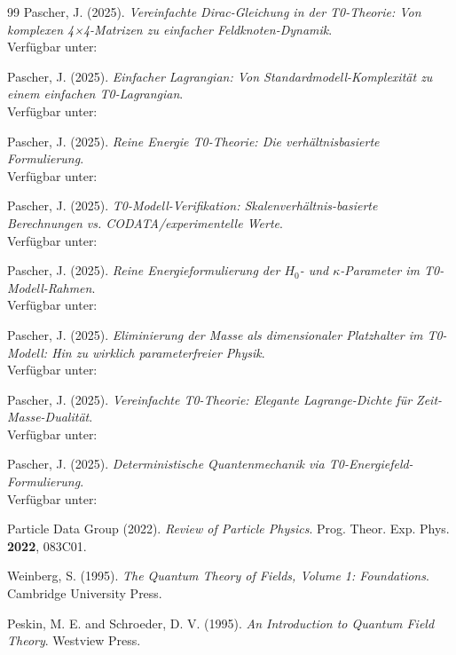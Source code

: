 	\begin{thebibliography}{99}
		Pascher, J. (2025). \textit{Vereinfachte Dirac-Gleichung in der T0-Theorie: Von komplexen 4×4-Matrizen zu einfacher Feldknoten-Dynamik}. \\
		Verfügbar unter: 
		
		Pascher, J. (2025). \textit{Einfacher Lagrangian: Von Standardmodell-Komplexität zu einem einfachen T0-Lagrangian}. \\
		Verfügbar unter: 
		
		Pascher, J. (2025). \textit{Reine Energie T0-Theorie: Die verhältnisbasierte Formulierung}. \\
		Verfügbar unter: 
		
		Pascher, J. (2025). \textit{T0-Modell-Verifikation: Skalenverhältnis-basierte Berechnungen vs. CODATA/experimentelle Werte}. \\
		Verfügbar unter: 
		
		Pascher, J. (2025). \textit{Reine Energieformulierung der $H_0$- und $\kappa$-Parameter im T0-Modell-Rahmen}. \\
		Verfügbar unter: 
		
		Pascher, J. (2025). \textit{Eliminierung der Masse als dimensionaler Platzhalter im T0-Modell: Hin zu wirklich parameterfreier Physik}. \\
		Verfügbar unter: 
		
		Pascher, J. (2025). \textit{Vereinfachte T0-Theorie: Elegante Lagrange-Dichte für Zeit-Masse-Dualität}. \\
		Verfügbar unter: 
		
		Pascher, J. (2025). \textit{Deterministische Quantenmechanik via T0-Energiefeld-Formulierung}. \\
		Verfügbar unter: 
		
		Particle Data Group (2022). \textit{Review of Particle Physics}. Prog. Theor. Exp. Phys. \textbf{2022}, 083C01.
		
		Weinberg, S. (1995). \textit{The Quantum Theory of Fields, Volume 1: Foundations}. Cambridge University Press.
		
		Peskin, M. E. and Schroeder, D. V. (1995). \textit{An Introduction to Quantum Field Theory}. Westview Press.
		

\end{thebibliography}
